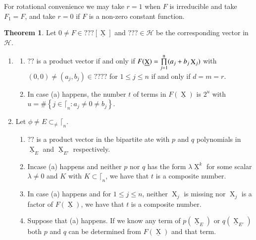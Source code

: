 \documentclass[a4paper,12pt]{article}
\DeclareMathOperator{\x}{\mathrm{X}}
\theoremstyle{definition}
\theoremstyle{underlinethm}
\newtheorem{thm}{Theorem}[section]
\theoremstyle{underline}
\begin{document}
 
 For rotational convenience we may take $r =1$ when $F$ is irreducible and take $F_{1} = F$, and take $r=0$ if $F$ is a non-zero constant function.
 
 \vspace{.2cm}
 
 \begin{thm}\label{thm-2.1}
  Let $0 \neq F \in ??? [\underline{\x}]$ and $??? \in \mathcal{H}$ be the corresponding vector in $\mathcal{H}$.
  
  \begin{enumerate}[label=(\roman*)] 
  \item 
  \begin{enumerate}[label=(\alph*)] 
   \item $??$ is a product vector if and only if $F(\underline{\x}) = \prod\limits_{j=1}^{\rm n} (a_{j} + b_{j} \x_{j})$ with $(0,0) \neq (a_{j}, b_{j}) \in ????$ for $1 \leq j \leq n$ if and only if $d=m=r$. 
   \item  In case (a) happens, the number $t$ of terms in $F(\underline{\x})$ is $2^{u}$ with $u = \# \left\{ j \in \lceil_{n} : a_{j}\neq  0 \neq b_{j} \right\}$.
  \end{enumerate}
  
  \item Let $\phi \neq E \subset_{\neq} \lceil_{n}$.
  
  \begin{enumerate}[label=(\alph*)] 
  
  \item $??$ is a product vector in the bipartite ate with $p$ and $q$ polynomials in $\underline{\x}_{E}$ and $\underline{\x}_{E'}$ respectively.
  
  \item Incase (a) happens and neither $p$ nor $q$ has the form $\lambda\underline{\x}^{k}$ for some scalar $\lambda \neq 0$ and $K$ with $K \subset \lceil_{n}$, we have that $t$ is a composite number.
  
  \item In case (a) happens and for $1 \leq j \leq n$, neither $\x_{j}$ is missing nor $\x_{j}$ is a factor of $F(\underline{\x})$, we have that $t$ is a composite number.
  
  \item Suppose that (a) happens. If we know any term of $p(\underline{\x}_{E})$ or $q(\underline{\x}_{E'})$ both $p$ and  $q$ can be determined from $F(\underline{\x})$ and that term.
  
  \end{enumerate}
  

\end{enumerate}
\end{thm}
\end{document}
